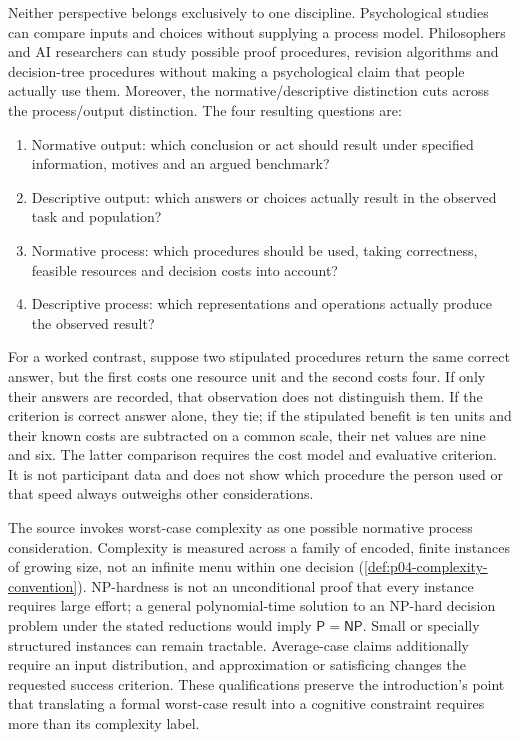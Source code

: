 Neither perspective belongs exclusively to one discipline.
Psychological studies can compare inputs and choices without supplying
a process model. Philosophers and AI researchers can study possible
proof procedures, revision algorithms and decision-tree procedures
without making a psychological claim that people actually use them.
Moreover, the normative/descriptive distinction cuts across the
process/output distinction. The four resulting questions are:

\begin{enumerate}
\item Normative output: which conclusion or act should result under
      specified information, motives and an argued benchmark?
\item Descriptive output: which answers or choices actually result
      in the observed task and population?
\item Normative process: which procedures should be used, taking
      correctness, feasible resources and decision costs into account?
\item Descriptive process: which representations and operations
      actually produce the observed result?
\end{enumerate}

For a worked contrast, suppose two stipulated procedures return the
same correct answer, but the first costs one resource unit and the
second costs four. If only their answers are recorded, that observation
does not distinguish them. If the criterion is correct answer alone,
they tie; if the stipulated benefit is ten units and their known costs
are subtracted on a common scale, their net values are nine and six.
The latter comparison requires the cost model and evaluative criterion.
It is not participant data and does not show which procedure the
person used or that speed always outweighs other considerations.

The source invokes worst-case complexity as one possible normative
process consideration. Complexity is measured across a family of
encoded, finite instances of growing size, not an infinite menu within
one decision (\cref{def:p04-complexity-convention}). NP-hardness is
not an unconditional proof that every instance requires large effort;
a general polynomial-time solution to an NP-hard decision problem
under the stated reductions would imply \(\mathsf P=\mathsf{NP}\).
Small or specially structured instances can remain tractable.
Average-case claims additionally require an input distribution, and
approximation or satisficing changes the requested success criterion.
These qualifications preserve the introduction's point that translating
a formal worst-case result into a cognitive constraint requires more
than its complexity label.

